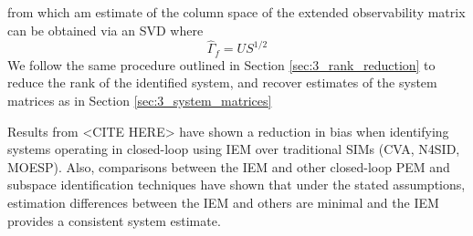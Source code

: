 from which am estimate of the column space of the extended observability matrix can be obtained via an SVD where
\begin{equation}
\hat{\Gamma}_f = US^{1/2}
\end{equation}
We follow the same procedure outlined in Section \ref{sec:3_rank_reduction} to reduce the rank of the identified system, and recover estimates of the system matrices as in Section \ref{sec:3_system_matrices}

Results from <CITE HERE> have shown a reduction in bias when identifying systems operating in closed-loop using IEM over traditional SIMs (CVA, N4SID, MOESP). Also, comparisons between the IEM and other closed-loop PEM and subspace identification techniques have shown that under the stated assumptions, estimation differences between the IEM and others are minimal and the IEM provides a consistent system estimate.

































